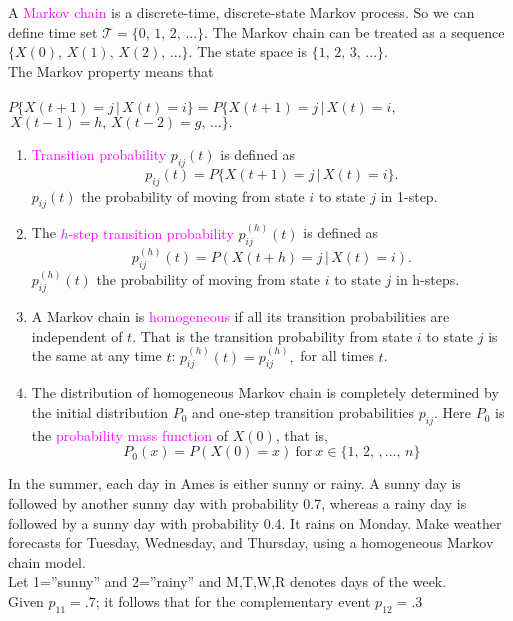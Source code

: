 \documentclass[20pt,landscape]{foils}
\newcommand{\no}{\noindent}
\begin{document}
\foilhead[-.8in]{\textcolor{blue}{Markov Chains}} 
\no A {\textcolor{magenta}{Markov chain}} is a discrete-time, discrete-state Markov
process. So we can define time set $\mathcal{T}=\{0,\,1,\,2,\,...\}$.
The Markov chain can be treated as a sequence $\{X(0),\, X(1),\, X(2),\,...\}$.
The state space is $\{1,\,2,\,3,\,...\}$.\\[.15in] 
\no The Markov property means
that \\\\[.1in]
$P\{X(t+1)=j\,|\, X(t)=i\}=P\{X(t+1)=j\,|\, X(t)=i,$\\
\hspace*{5in}$\, X(t-1)=h,\, X(t-2)=g,\,...\}.$
\begin{enumerate}
\item {\textcolor{magenta}{Transition probability}} $p_{ij}(t)$ is defined as \[
p_{ij}(t)=P\{X(t+1)=j\,|\, X(t)=i\}.\]
$p_{ij}(t)$ the probability of moving from state $i$ to state $j$ in 1-step.
\item The {\textcolor{magenta}{$h$-step transition probability}} $p_{ij}^{(h)}(t)$ is
defined as
\[p_{ij}^{(h)}(t)=P(X(t+h)=j\,|\, X(t)=i).\]
 $p_{ij}^{(h)}(t)$ the probability of moving from state $i$ to state $j$ in h-steps.
\item A Markov chain is {\textcolor{magenta}{homogeneous}} if all its transition probabilities
are independent of $t$. That is  the transition probability from state $i$ to state $j$ is the same at any time $t$:  $p_{ij}^{(h)}(t)=p_{ij}^{(h)},$ for all times  $t$.
\item The distribution of homogeneous Markov chain is completely determined by the initial
distribution $P_{0}$ and one-step transition probabilities $p_{ij}$.
Here $P_{0}$ is the {\textcolor{magenta}{probability mass function}} of $X(0)$, that is,
\[ P_{0}(x)=P(X(0)=x)\ \mathrm{for}\ x\in\{1,\,2,\,,...,\, n\}\]
\end{enumerate}
\foilhead[-.8in]{\textcolor{blue}{Markov Chains : Example}} 
\no In the summer, each day in Ames is either sunny or rainy. A sunny
day is followed by another sunny day with probability 0.7, whereas
a rainy day is followed by a sunny day with probability 0.4. It rains
on Monday. Make weather forecasts for Tuesday, Wednesday, and Thursday, using a homogeneous Markov chain model.\\[.1in]
\no Let 1=''sunny'' and 2=''rainy'' and M,T,W,R denotes days of the week.\\[.1in]
Given $p_{11}=.7$; it follows that for the complementary event  $p_{12}=.3$\\[.1in]
\end{document}
